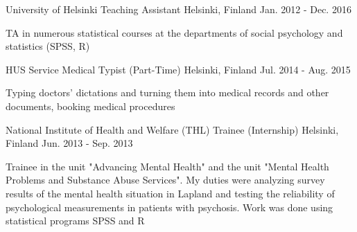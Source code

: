 \begin{cventries}
  \cventry
    {University of Helsinki} %
    {Teaching Assistant} %
    {Helsinki, Finland} %
    {Jan. 2012 - Dec. 2016} %
    {
      \begin{cvitems} %
        \item {TA in numerous statistical courses at the departments of social
        psychology and statistics (SPSS, R)}
      \end{cvitems}
    }

  \cventry
    {HUS Service} %
    {Medical Typist (Part-Time)} %
    {Helsinki, Finland} %
    {Jul. 2014 - Aug. 2015} %
    {
      \begin{cvitems} %
        \item {Typing doctors' dictations and turning them into medical records and
        other documents, booking medical procedures}
      \end{cvitems}
    }

  \cventry
    {National Institute of Health and Welfare (THL)} %
    {Trainee (Internship)} %
    {Helsinki, Finland} %
    {Jun. 2013 - Sep. 2013} %
    {
      \begin{cvitems} %
        \item {Trainee in the unit "Advancing Mental Health" and the unit
        "Mental Health Problems and Substance Abuse Services".
        My duties were analyzing survey results of the mental health situation
        in Lapland and testing the reliability of psychological measurements
        in patients with psychosis. Work was done using statistical programs SPSS and R}
      \end{cvitems}
    }


\end{cventries}
